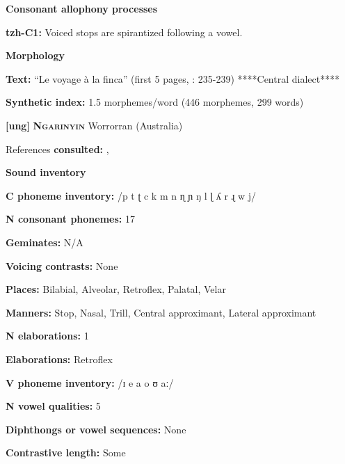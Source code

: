 \textbf{Consonant allophony processes}



\textbf{tzh-C1:} Voiced stops are spirantized following a vowel. \citep[11]{Kaufman1971}



\textbf{Morphology}



\textbf{Text:} “Le voyage à la finca” (first 5 pages, \citealt{Polian2006}: 235-239) ****Central dialect****



\textbf{Synthetic index:} 1.5 morphemes/word (446 morphemes, 299 words)



\textbf{[ung]}   \textbf{\textsc{Ngarinyin}}  Worrorran (Australia)



References \textbf{consulted:} \citet{CoateOates1970}, \citet{Rumsey1978}



\textbf{Sound inventory}



\textbf{C phoneme inventory:} /p t ʈ c k m n ɳ ɲ ŋ l ɭ ʎ r ɻ w j/



\textbf{N consonant phonemes:} 17



\textbf{Geminates:} N/A



\textbf{Voicing contrasts:} None



\textbf{Places:} Bilabial, Alveolar, Retroflex, Palatal, Velar



\textbf{Manners:} Stop, Nasal, Trill, Central approximant, Lateral approximant



\textbf{N elaborations:} 1



\textbf{Elaborations:} Retroflex



\textbf{V phoneme inventory:} /ɪ e a o ʊ aː/



\textbf{N vowel qualities:} 5



\textbf{Diphthongs or vowel sequences:} None



\textbf{Contrastive length:} Some



